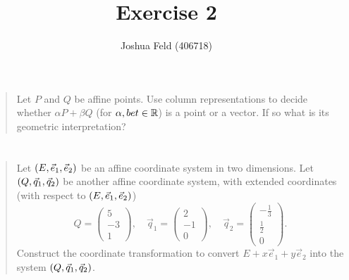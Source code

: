 \documentclass[english]{exercise}
\title{Exercise 2}
\author{Joshua Feld (406718)}
\begin{document}
    \maketitle
    

    \section{}
    
    \begin{quote}
        Let \(P\) and \(Q\) be affine points.
        Use column representations to decide whether \(\alpha P + \beta Q\) (for \(\alpha, bet \in \R\)) is a point or a vector.
        If so what is its geometric interpretation?
    \end{quote}
    
    
    \section{}
    
    \begin{quote}
        Let \(\parentheses*{E, \vec{e}_1, \vec{e}_2}\) be an affine coordinate system in two dimensions.
        Let \(\parentheses*{Q, \vec{q}_1, \vec{q}_2}\) be another affine coordinate system, with extended coordinates (with respect to \(\parentheses*{E, \vec{e}_1, \vec{e}_2}\))
        \[
            Q = \begin{pmatrix}
                5\\
                -3\\
                1
            \end{pmatrix}, \quad \vec{q}_1 = \begin{pmatrix}
                2\\
                -1\\
                0
            \end{pmatrix}, \quad \vec{q}_2 = \begin{pmatrix}
                -\frac{1}{3}\\
                \frac{1}{2}\\
                0
            \end{pmatrix}.
        \]
        Construct the coordinate transformation to convert \(E + x\vec{e}_1 + y\vec{e}_2\) into the system \(\parentheses*{Q, \vec{q}_1, \vec{q}_2}\).
    \end{quote}
    
    \section{}
    
\end{document}
